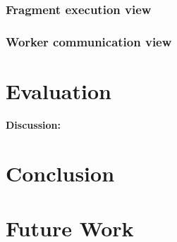 \documentclass{chi2009}
\begin{document}

\subsubsection{Fragment execution view}


\subsubsection{Worker communication view}


\section{Evaluation}



\textbf{Discussion:}

\section{Conclusion}


\section{Future Work}




\end{document}
